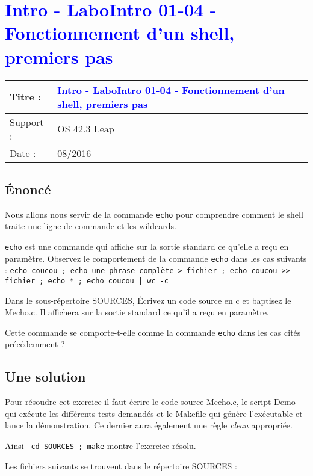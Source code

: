 \lstset{language=c}
\renewcommand{\titre}{\textcolor{blue}{ Intro - LaboIntro 01-04 - Fonctionnement d'un shell, premiers pas}}

\lhead{ \titre }
\section{{\titre} }

\begin{tabular}{|l|l|}
\hline
Titre : 	& \titre \\\hline
Support : 	& OS 42.3 Leap \\\hline
Date :		& 08/2016 \\\hline
\end{tabular}

\subsection{Énoncé}

Nous allons nous servir de la commande \texttt{echo} pour comprendre comment le shell traite une ligne de commande et les wildcards.

\texttt{echo} est une commande qui affiche sur la sortie standard ce qu'elle a reçu en paramètre.
Observez le comportement de la commande \texttt{echo} dans les cas suivants : \texttt{echo coucou ; echo une phrase complète > fichier ; echo coucou >{}> fichier ; echo * ; echo coucou | wc -c} 

Dans le sous-répertoire SOURCES, Écrivez un code source en c et baptisez le Mecho.c. Il affichera sur la sortie standard ce qu'il a reçu en paramètre.

Cette commande se comporte-t-elle comme la commande \texttt{echo} dans les cas cités précédemment ?


\subsection{Une solution}

Pour résoudre cet exercice il faut écrire le code source Mecho.c, le script Demo qui exécute les différents tests demandés et le Makefile qui génère l'exécutable et lance la démonstration. Ce dernier aura également une règle \emph{clean} appropriée.

Ainsi \texttt { cd SOURCES ; make} montre l'exercice résolu. 

Les fichiers suivants se trouvent dans le répertoire SOURCES :





